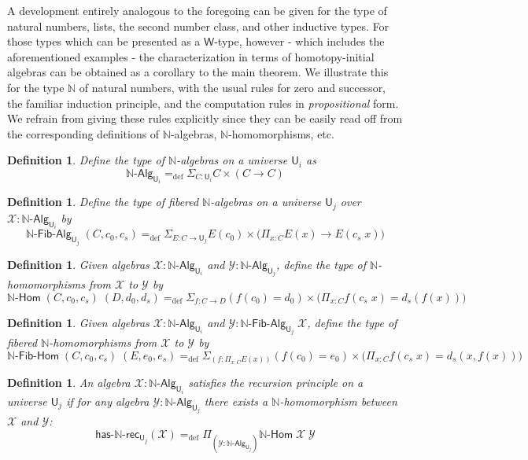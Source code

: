 \documentclass[reqno,10pt,a4paper,oneside]{amsart}
\newcommand{\X}{\mathcal{X}}
\newcommand{\Y}{\mathcal{Y}}
\newcommand{\prd}[1]{\Pi_{#1}}
\newcommand{\sm}[1]{\Sigma_{#1}}
\newcommand{\defeq}{=_{\mathrm{def}}}
\newcommand{\nat}{\ensuremath{\mathbb{N}}}
\newcommand{\W}{\mathsf{W}}
\newcommand{\UU}{\mathsf{U}}
\newcommand{\NatAlg}{\nat\text{-}\mathsf{Alg}}
\newcommand{\NatHom}{\nat\text{-}\mathsf{Hom}}
\newcommand{\HasNatRec}{\mathsf{has}\text{-}\nat\text{-}\mathsf{rec}}
\newcommand{\NatFibAlg}{\nat\text{-}\mathsf{Fib}\text{-}\mathsf{Alg}}
\newcommand{\NatFibHom}{\nat\text{-}\mathsf{Fib}\text{-}\mathsf{Hom}}
\numberwithin{equation}{section}
\theoremstyle{mythm}
\theoremstyle{mydef}
\newtheorem{definition}[theorem]{Definition}
\theoremstyle{myrmk}
\begin{document}
A development entirely analogous to the foregoing can be given for the type of natural numbers, lists, the second number class, and other inductive types. For those types which can be presented as a $\W$-type, however - which includes the aforementioned examples - the characterization in terms of homotopy-initial algebras can be obtained as a corollary to the main theorem. We illustrate this for the type $\nat$ of natural numbers, with the usual rules for zero and successor, the familiar induction principle, and the computation rules in \emph{propositional} form. We refrain from giving these rules explicitly since they can be easily read off from the corresponding definitions of $\nat$-algebras, $\nat$-homomorphisms, etc.

\begin{definition}\label{def:NatAlg}
Define the type of \emph{$\nat$-algebras} on a universe $\UU_i$ as 
\[\NatAlg_{\UU_i} \defeq \sm{C : \UU_i} C \times (C \to C) \]
\end{definition}

\begin{definition}\label{def:NatFibAlg}
Define the type of \emph{fibered $\nat$-algebras} on a universe $\UU_j$ over $\mathcal{X} : \NatAlg_{\UU_i}$ by
\[\NatFibAlg_{\UU_j} \; (C,c_0,c_s) \defeq \sm{E : C \to \UU_j} E(c_0) \times \big(\prd{x:C} E(x) \to E(c_s \; x)\big) \]
\end{definition}

\begin{definition}\label{def:NatHom}
Given algebras $\X : \NatAlg_{\UU_i}$ and $\Y : \NatAlg_{\UU_j}$, define the type of \emph{$\nat$-homomorphisms} from $\X$ to $\Y$ by 
\[\NatHom \; (C,c_0,c_s) \; (D,d_0,d_s) \defeq \sm{f:C \to D} (f(c_0) = d_0) \times \big(\prd{x:C} f(c_s\;x) = d_s(f(x))\big) \]
\end{definition}

\begin{definition}\label{def:NatFibHom}
Given algebras $\X : \NatAlg_{\UU_i}$ and $\Y : \NatFibAlg_{\UU_j} \; \X$, define the type of \emph{fibered $\nat$-homomorphisms} from $\X$ to $\Y$ by
\[\NatFibHom \; (C,c_0,c_s) \; (E,e_0,e_s) \defeq \sm{(f:\prd{x:C} E(x))} (f(c_0) = e_0) \times \big(\prd{x:C} f(c_s\;x) = d_s(x,f(x))\big) \]
\end{definition}

\begin{definition}\label{def:NatRec}
An algebra $\X : \NatAlg_{\UU_i}$ \emph{satisfies the recursion principle} on a universe $\UU_j$ if for any 
algebra $\Y : \NatAlg_{\UU_j}$ there exists a $\nat$-homomorphism between $\X$ and $\Y$:
\[\HasNatRec_{\UU_j}(\X) \defeq \prd{(\Y:\NatAlg_{\UU_j})} \NatHom \; \X \; \Y\] 
\end{definition}
\end{document}
